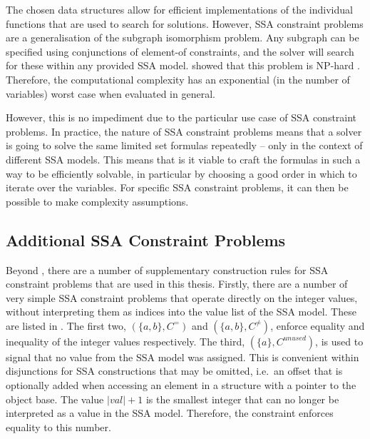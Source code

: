    The chosen data structures allow for efficient implementations
    of the individual functions that are used to search for solutions.
    However, SSA constraint problems are a generalisation of the subgraph
    isomorphism problem.
    Any subgraph can be specified using conjunctions of element-of constraints,
    and the solver will search for these within any provided SSA model.
    \citet{Cook:1971:CTP:800157.805047} showed that this problem is NP-hard
    \citep{Leeuwen:1990:HTC:574797}.
    Therefore, the computational complexity has an exponential
    (in the number of variables) worst case when evaluated in general.

    However, this is no impediment due to the particular use case of
    SSA constraint problems.
    In practice, the nature of SSA constraint problems means that a solver is
    going to solve the same limited set formulas repeatedly -- only in the
    context of different SSA models.
    This means that is it viable to craft the formulas in such a way to be
    efficiently solvable, in particular by choosing a good order in which to
    iterate over the variables.
    For specific SSA constraint problems, it can then be possible to make
    complexity assumptions.

\subsection{Additional SSA Constraint Problems}

    Beyond , there are a
    number of supplementary construction rules for SSA constraint problems that
    are used in this thesis.
    Firstly, there are a number of very simple SSA constraint problems that
    operate directly on the integer values, without interpreting them as indices
    into the value list of the SSA model.
    These are listed in .
    The first two, $(\{a,b\}, C^=)$ and $(\{a,b\}, C^{\neq})$, enforce
    equality and inequality of the integer values respectively.
    The third, $(\{a\}, C^{unused})$, is used to signal that no value from the
    SSA model was assigned.
    This is convenient within disjunctions for SSA constructions that may be
    omitted, i.e.\ an offset that is optionally added when accessing an element
    in a structure with a pointer to the object base.
    The value $|val|+1$ is the smallest integer that can no longer be
    interpreted as a value in the SSA model.
    Therefore, the constraint enforces equality to this number.

